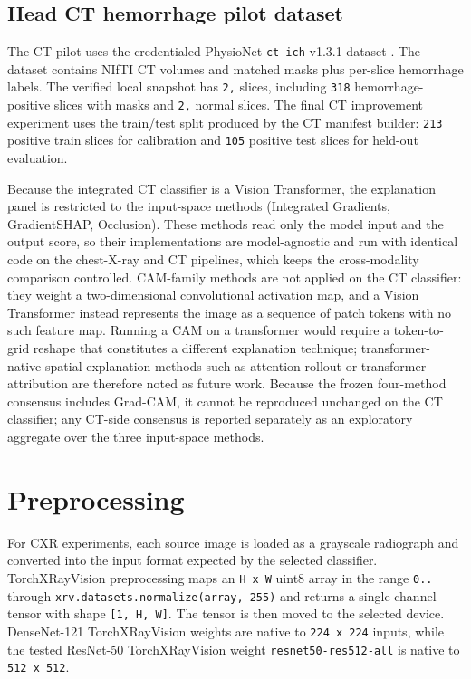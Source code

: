\hypertarget{head-ct-hemorrhage-pilot-dataset}{%
	\subsection{Head CT hemorrhage pilot
		dataset}\label{head-ct-hemorrhage-pilot-dataset}}

The CT pilot uses the credentialed PhysioNet \texttt{ct-\allowbreak ich} v1.3.1
dataset \cite{ref-ct-ich, ref-physionet}. The dataset
contains NIfTI CT volumes and matched masks plus per-slice hemorrhage labels. The
verified local snapshot has \texttt{2,} slices, including
\texttt{318} hemorrhage-positive slices with masks and \texttt{2,}
normal slices. The final CT improvement experiment uses the train/test
split produced by the CT manifest builder: \texttt{213} positive train
slices for calibration and \texttt{105} positive test slices for
held-out evaluation.

Because the integrated CT classifier is a Vision Transformer, 
the explanation panel is restricted to the input-space
methods (Integrated Gradients, GradientSHAP,
Occlusion). These methods read only the model input and the
output score, so their implementations are model-agnostic and run with
identical code on the chest-X-ray and CT pipelines, which keeps the
cross-modality comparison controlled. CAM-family methods
 are not applied on the CT classifier: they weight a
two-dimensional convolutional activation map, and a Vision Transformer
\cite{ref-vit} instead represents the image as a sequence of patch
tokens with no such feature map. Running a CAM on a transformer would
require a token-to-grid reshape that constitutes a different explanation
technique;
transformer-native spatial-explanation methods such as attention rollout
\cite{ref-attention-rollout} or transformer attribution
\cite{ref-transformer-attribution} are therefore noted as future work. 
Because the frozen four-method consensus includes
Grad-CAM, it cannot be reproduced unchanged on the CT
classifier; any CT-side consensus is reported separately as an
exploratory aggregate over the three input-space methods.

\hypertarget{preprocessing}{%
	\section{Preprocessing}\label{preprocessing}}

For CXR experiments, each source image is loaded as a grayscale
radiograph and converted into the input format expected by the selected
classifier. TorchXRayVision preprocessing maps an \texttt{H\ x\ W} uint8
array in the range \texttt{0.\allowbreak .} through
\texttt{xrv.\allowbreak datasets.\allowbreak normalize(array,\allowbreak \ 255)} and returns a
single-channel tensor with shape \texttt{{[}1,\ H,\ W{]}}. The tensor is
then moved to the selected device. DenseNet-121 TorchXRayVision weights
are native to \texttt{224\ x\ 224} inputs, while the tested ResNet-50
TorchXRayVision weight \texttt{resnet50-\allowbreak res512-\allowbreak all} is native to
\texttt{512\ x\ 512}.

